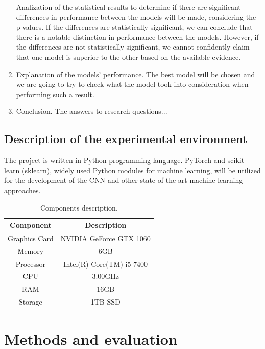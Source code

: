 \documentclass[runningheads]{llncs}
\begin{document}
\begin{enumerate}
  Analization of the statistical results to determine if there are significant differences in performance between the models will be made, considering the p-values. If the differences are statistically significant, we can conclude that there is a notable distinction in performance between the models. However, if the differences are not statistically significant, we cannot confidently claim that one model is superior to the other based on the available evidence.
  \item Explanation of the models' performance.
  \newline
  The best model will be chosen and we are going to try to check what the model took into consideration when performing such a result.
  \item Conclusion.
  \newline
  The answers to research questions...
\end{enumerate}

\subsection{Description of the experimental environment}
The project is written in Python programming language. PyTorch and scikit-learn (sklearn), widely used Python modules for machine learning, will be utilized for the development of the CNN and other state-of-the-art machine learning approaches.

\begin{table}[H]
\caption{Components description.}
\centering
\begin{tabular}{|c|c|}
\hline
Component     & Description               \\ \hline
Graphics Card & NVIDIA GeForce GTX 1060   \\ \hline
Memory        & 6GB                       \\ \hline
Processor     & Intel(R) Core(TM) i5-7400 \\ \hline
CPU           & 3.00GHz                   \\ \hline
RAM           & 16GB                      \\ \hline
Storage       & 1TB SSD                   \\ \hline
\end{tabular}
\end{table}


\section{Methods and evaluation}
\end{document}
